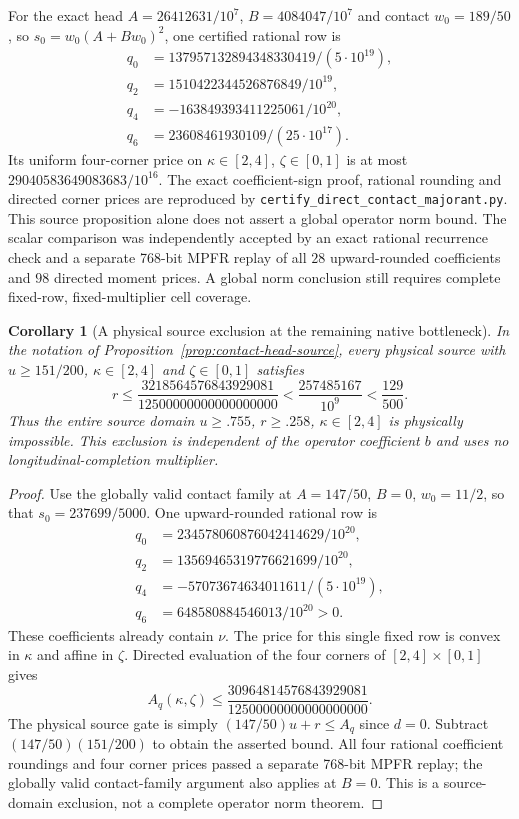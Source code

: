\documentclass[11pt]{article}
\newtheorem{corollary}[theorem]{Corollary}
\begin{document}
For the exact head $A=26412631/10^7$, $B=4084047/10^7$ and contact
$w_0=189/50$, so $s_0=w_0(A+Bw_0)^2$, one certified rational row is
\[
\begin{split}
q_0&=137957132894348330419/(5\cdot10^{19}),\\
q_2&=1510422344526876849/10^{19},\\
q_4&=-163849393411225061/10^{20},\\
q_6&=23608461930109/(25\cdot10^{17}).
\end{split}
\]
Its uniform four-corner price on $\kappa\in[2,4]$, $\zeta\in[0,1]$ is at most
$29040583649083683/10^{16}$.
The exact coefficient-sign proof, rational rounding and directed corner
prices are reproduced by
\texttt{certify\_\allowbreak direct\_\allowbreak contact\_\allowbreak majorant.py}.
This source proposition alone does not assert a global operator norm bound.
The scalar comparison was independently accepted by an exact rational
recurrence check and a separate 768-bit MPFR replay of all $28$ upward-rounded
coefficients and $98$ directed moment prices.  A global norm conclusion still
requires complete fixed-row, fixed-multiplier cell coverage.

\begin{corollary}[A physical source exclusion at the remaining native bottleneck]
In the notation of Proposition~\ref{prop:contact-head-source}, every physical
source with $u\ge151/200$, $\kappa\in[2,4]$ and $\zeta\in[0,1]$ satisfies
\[
 r\le\frac{3218564576843929081}{12500000000000000000}
 <\frac{257485167}{10^9}<\frac{129}{500}.
\]
Thus the entire source domain $u\ge.755$, $r\ge.258$, $\kappa\in[2,4]$
is physically impossible.  This exclusion is independent of the operator
coefficient $b$ and uses no longitudinal-completion multiplier.
\end{corollary}
\begin{proof}
Use the globally valid contact family at $A=147/50$, $B=0$, $w_0=11/2$,
so that $s_0=237699/5000$.  One upward-rounded rational row is
\[
\begin{split}
q_0&=234578060876042414629/10^{20},\\
q_2&=13569465319776621699/10^{20},\\
q_4&=-57073674634011611/(5\cdot10^{19}),\\
q_6&=648580884546013/10^{20}>0.
\end{split}
\]
These coefficients already contain $\nu$.  The price for this single fixed
row is convex in $\kappa$ and affine in $\zeta$.  Directed evaluation of the
four corners of $[2,4]\times[0,1]$ gives
\[
 A_q(\kappa,\zeta)
 \le\frac{30964814576843929081}{12500000000000000000}.
\]
The physical source gate is simply $(147/50)u+r\le A_q$ since $d=0$.
Subtract $(147/50)(151/200)$ to obtain the asserted bound.
All four rational coefficient roundings and four corner prices passed a
separate 768-bit MPFR replay; the globally valid contact-family argument
also applies at $B=0$.
This is a source-domain exclusion, not a complete operator norm theorem.
\end{proof}
\end{document}

